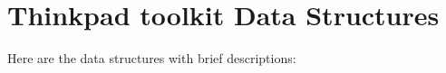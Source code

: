 \section{Thinkpad toolkit Data Structures}
Here are the data structures with brief descriptions:\begin{CompactList}
\item{}
\end{CompactList}
